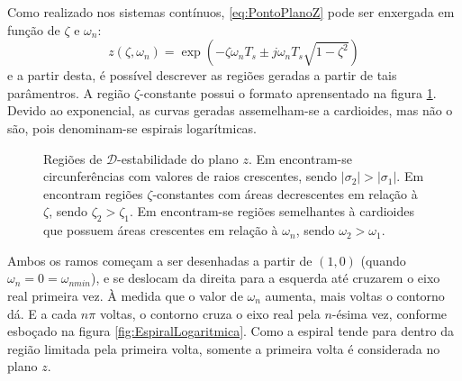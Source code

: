 Como realizado nos sistemas contínuos, \eqref{eq:PontoPlanoZ} pode ser enxergada em função de $\zeta$ e $\omega_n$:
\begin{equation}
  z(\zeta,\omega_n) = \exp{\left(-\zeta\omega_nT_s \pm j\omega_nT_s\sqrt{1-\zeta^2}\right)}\label{eq:FuncaoPontoZ}
\end{equation}
e a partir desta, é possível descrever as regiões geradas a partir de tais parâmentros. A região $\zeta$-constante possui o formato aprensentado na figura \ref{subfig:EstabilidadeRelativaZ}. Devido ao exponencial, as curvas geradas assemelham-se a cardioides, mas não o são, pois denominam-se espirais logarítmicas.
\begin{figure}[!ht]
  \centering
  \begin{subfigure}[t]{0.3\columnwidth}
      
      \caption{}
      \label{subfig:EstabilidadeRelativaZ}
  \end{subfigure}
  \begin{subfigure}[t]{0.3\columnwidth}
      
      \caption{}
      \label{subfig:TaxaDeAmortecimentoZ}
  \end{subfigure}
  \begin{subfigure}[t]{0.3\columnwidth}
    
    \caption{}
    \label{subfig:OscilacaoNaoAmortecidaZ}
  \end{subfigure}
  \caption{Regiões de $\mathscr{D}$-estabilidade do plano $z$. Em  encontram-se circunferências com valores de raios crescentes, sendo $|\sigma_2| > |\sigma_1|$. Em  encontram regiões $\zeta$-constantes com áreas decrescentes em relação à $\zeta$, sendo $\zeta_2 > \zeta_1$. Em  encontram-se regiões semelhantes à cardioides que possuem áreas crescentes em relação à $\omega_n$, sendo $\omega_2 > \omega_1$.}
  \label{fig:RegioesPlanoZ}
\end{figure}

Ambos os ramos começam a ser desenhadas a partir de $(1,0)$ (quando $\omega_n = 0 = \omega_{nmin}$), e se deslocam da direita para a esquerda até cruzarem o eixo real primeira vez. À medida que o valor de $\omega_n$ aumenta, mais voltas o contorno dá. E a cada $n\pi$ voltas, o contorno cruza o eixo real pela $n$-ésima vez, conforme esboçado na figura \ref{fig:EspiralLogaritmica}. Como a espiral tende para dentro da região limitada pela primeira volta, somente a primeira volta é considerada no plano $z$.

